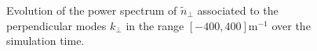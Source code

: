 \begin{figure}[H]
\begin{subfigure}[t]{0.45\textwidth}
		\label{fig:CIRC_evolutionKperp_flutter}
	\end{subfigure}
	\caption{Evolution of the power spectrum of $\tilde{n}_\perp$ associated to the perpendicular modes $k_\perp$ in the range $[-400,400]$m$^{-1}$ over the simulation time. }
	\label{fig:CIRC_evolutionKperp}
\end{figure}










